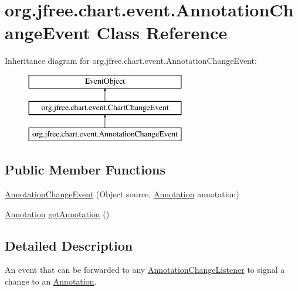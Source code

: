 \hypertarget{classorg_1_1jfree_1_1chart_1_1event_1_1_annotation_change_event}{}\section{org.\+jfree.\+chart.\+event.\+Annotation\+Change\+Event Class Reference}
\label{classorg_1_1jfree_1_1chart_1_1event_1_1_annotation_change_event}
Inheritance diagram for org.\+jfree.\+chart.\+event.\+Annotation\+Change\+Event\+:\begin{figure}[H]
\begin{center}
\leavevmode
\includegraphics[height=3.000000cm]{classorg_1_1jfree_1_1chart_1_1event_1_1_annotation_change_event}
\end{center}
\end{figure}
\subsection*{Public Member Functions}
\begin{DoxyCompactItemize}
\item 
\mbox{\hyperlink{classorg_1_1jfree_1_1chart_1_1event_1_1_annotation_change_event_a4f2cb06ec7f46eeee4274e3ef4c0ebbc}{Annotation\+Change\+Event}} (Object source, \mbox{\hyperlink{interfaceorg_1_1jfree_1_1chart_1_1annotations_1_1_annotation}{Annotation}} annotation)
\item 
\mbox{\hyperlink{interfaceorg_1_1jfree_1_1chart_1_1annotations_1_1_annotation}{Annotation}} \mbox{\hyperlink{classorg_1_1jfree_1_1chart_1_1event_1_1_annotation_change_event_a4d79564e1477ab556a141f2bd4ef5917}{get\+Annotation}} ()
\end{DoxyCompactItemize}


\subsection{Detailed Description}
An event that can be forwarded to any \mbox{\hyperlink{interfaceorg_1_1jfree_1_1chart_1_1event_1_1_annotation_change_listener}{Annotation\+Change\+Listener}} to signal a change to an \mbox{\hyperlink{}{Annotation}}.

